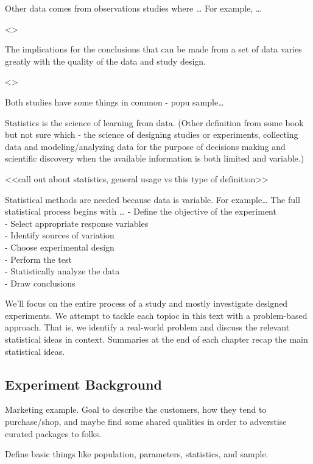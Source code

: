 \documentclass[
]{book}
\theoremstyle{definition}
\theoremstyle{definition}
\theoremstyle{definition}
\theoremstyle{remark}
\begin{document}
Other data comes from observations studies where \ldots{} For example, \ldots{}

\textless{}\textgreater{}

The implications for the conclusions that can be made from a set of data varies greatly with the quality of the data and study design.

\textless{}\textgreater{}

Both studies have some things in common - popu sample\ldots{}

Statistics is the science of learning from data. (Other definition from some book but not sure which - the science of designing studies or experiments, collecting data and modeling/analyzing data for the purpose of decisions making and scientific discovery when the available information is both limited and variable.)

\textless\textless call out about statistics, general usage vs this type of definition\textgreater\textgreater{}

Statistical methods are needed because data is variable. For example\ldots{} The full statistical process begins with \ldots{}
- Define the objective of the experiment\\
- Select appropriate response variables\\
- Identify sources of variation\\
- Choose experimental design\\
- Perform the test\\
- Statistically analyze the data\\
- Draw conclusions

We'll focus on the entire process of a study and mostly investigate designed experiments. We attempt to tackle each topioc in this text with a problem-based approach. That is, we identify a real-world problem and discuss the relevant statistical ideas in context. Summaries at the end of each chapter recap the main statistical ideas.

\hypertarget{experiment-background}{%
\subsection{Experiment Background}\label{experiment-background}}

Marketing example. Goal to describe the customers, how they tend to purchase/shop, and maybe find some shared qualities in order to adverstise curated packages to folks.

Define basic things like population, parameters, statistics, and sample.
\end{document}
